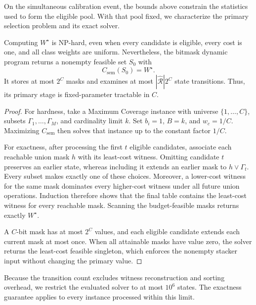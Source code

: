 On the simultaneous calibration event, the bounds above constrain the
statistics used to form the eligible pool. With that pool fixed, we
characterize the primary selection problem and its exact solver.

\begin{theorem}
\label{thm:primary_solver}
Computing $W^\star$ is NP-hard, even when every candidate is eligible, every
cost is one, and all class weights are uniform. Nevertheless, the bitmask
dynamic program returns a
nonempty feasible set $S_0$ with
\begin{equation}
C_{\mathrm{sem}}(S_0)=W^\star.
\end{equation}
It stores at most $2^C$ masks and examines at most
$|\widehat{\mathcal R}|2^C$ state transitions. Thus, its primary stage is
fixed-parameter tractable in $C$.
\end{theorem}

\begin{proof}
For hardness, take a Maximum Coverage instance with universe
$\{1,\ldots,C\}$, subsets $\Gamma_1,\ldots,\Gamma_M$, and cardinality
limit $k$. Set $b_i=1$, $B=k$, and $w_c=1/C$. Maximizing
$C_{\mathrm{sem}}$ then solves that instance up to the constant factor
$1/C$.

For exactness, after processing the first $t$ eligible candidates, associate
each reachable union mask $h$ with its least-cost witness. Omitting candidate
$t$ preserves an earlier state, whereas including it extends an earlier
mask to $h\vee\Gamma_t$. Every subset makes exactly one of these choices.
Moreover, a lower-cost witness for the same mask dominates every higher-cost
witness under all future union operations. Induction therefore shows that
the final table contains the least-cost witness for every reachable mask.
Scanning the budget-feasible masks returns exactly $W^\star$.

A $C$-bit mask has at most $2^C$ values, and each eligible candidate extends
each current mask at most once. When all attainable masks have value zero,
the solver returns the least-cost feasible singleton, which enforces
the nonempty stacker input without changing the primary value.
\end{proof}

Because the transition count excludes witness reconstruction and sorting
overhead, we restrict the evaluated solver to at most $10^6$ states. The
exactness guarantee applies to every instance processed within this limit.

